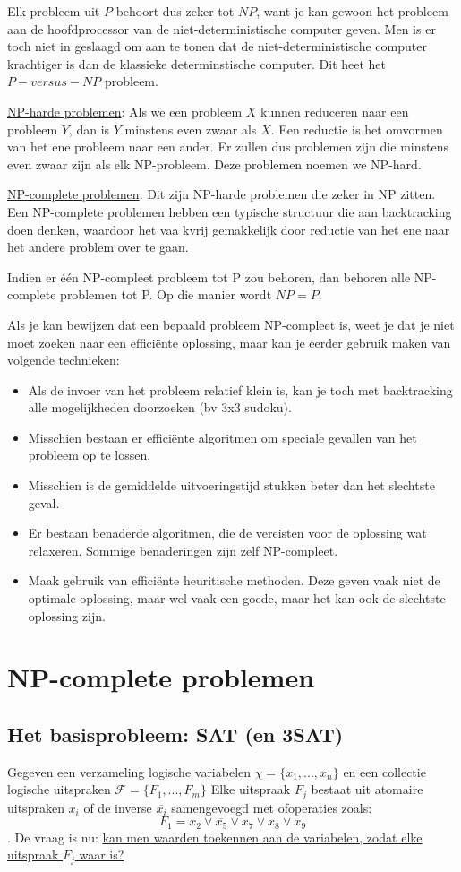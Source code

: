 \documentclass{report}
\begin{document}
Elk probleem uit $P$ behoort dus zeker tot $NP$, want je kan gewoon het probleem aan de hoofdprocessor van de niet-deterministische computer geven. Men is er toch niet in geslaagd om aan te tonen dat de niet-deterministische computer krachtiger is dan de klassieke determinstische computer. Dit heet het $P-versus-NP$ probleem.

\underline{NP-harde problemen}: Als we een probleem $X$ kunnen reduceren naar een probleem $Y$, dan is $Y$ minstens even zwaar als $X$. Een reductie is het omvormen van het ene probleem naar een ander. Er zullen dus problemen zijn die minstens even zwaar zijn als elk NP-probleem. Deze problemen noemen we NP-hard.

\underline{NP-complete problemen}: Dit zijn NP-harde problemen die zeker in NP zitten. Een NP-complete problemen hebben een typische structuur die aan backtracking doen denken, waardoor het vaa kvrij gemakkelijk door reductie van het ene naar het andere problem over te gaan.

Indien er één NP-compleet probleem tot P zou behoren, dan behoren alle NP-complete problemen tot P. Op die manier wordt $NP = P$.

Als je kan bewijzen dat een bepaald probleem NP-compleet is, weet je dat je niet moet zoeken naar een efficiënte oplossing, maar kan je eerder gebruik maken van volgende technieken:
\begin{itemize}
	\item Als de invoer van het probleem relatief klein is, kan je toch met backtracking alle mogelijkheden doorzoeken (bv 3x3 sudoku).
	\item Misschien bestaan er efficiënte algoritmen om speciale gevallen van het probleem op te lossen.
	\item Misschien is de gemiddelde uitvoeringstijd stukken beter dan het slechtste geval.
	\item Er bestaan benaderde algoritmen, die de vereisten voor de oplossing wat relaxeren. Sommige benaderingen zijn zelf NP-compleet.
	\item Maak gebruik van efficiënte heuritische methoden. Deze geven vaak niet de optimale oplossing, maar wel vaak een goede, maar het kan ook de slechtste oplossing zijn.
\end{itemize}

\section{NP-complete problemen}
\subsection{Het basisprobleem: SAT (en 3SAT)}
Gegeven een verzameling logische variabelen $\chi = \{x_1, ..., x_n\}$ en een collectie logische uitspraken $\mathcal{F} = \{F_1, ..., F_m \}$
Elke uitspraak $F_j$ bestaat uit atomaire uitspraken $x_i$ of de inverse $\overline{x_i}$ samengevoegd met ofoperaties zoals:
$$F_1 = x_2 \vee \overline{x_5} \vee x_7 \vee x_8 \vee x_9$$.
De vraag is nu: \underline{kan men waarden toekennen aan de variabelen, zodat elke uitspraak $F_j$ waar is?} 
\end{document}
